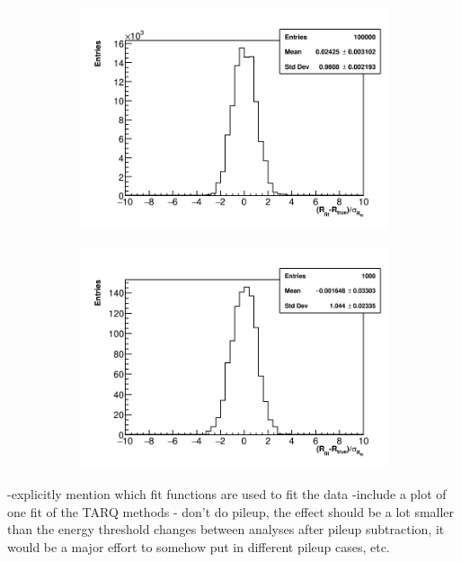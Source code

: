 \begin{figure}[]
    \begin{subfigure}[t]{0.45\textwidth}
        \centering
        \includegraphics[width=\textwidth]{Rpull_RMethod}
        \caption{}
    \end{subfigure}
    \hspace{1mm}
    \begin{subfigure}[t]{0.45\textwidth}
        \centering
        \includegraphics[width=\textwidth]{Rpull_QMethod}
        \caption{}
    \end{subfigure}
\caption[]{}
\label{fig:}
\end{figure}




-explicitly mention which fit functions are used to fit the data
-include a plot of one fit of the TARQ methods
- don't do pileup, the effect should be a lot smaller than the energy threshold changes between analyses after pileup subtraction, it would be a major effort to somehow put in different pileup cases, etc.


